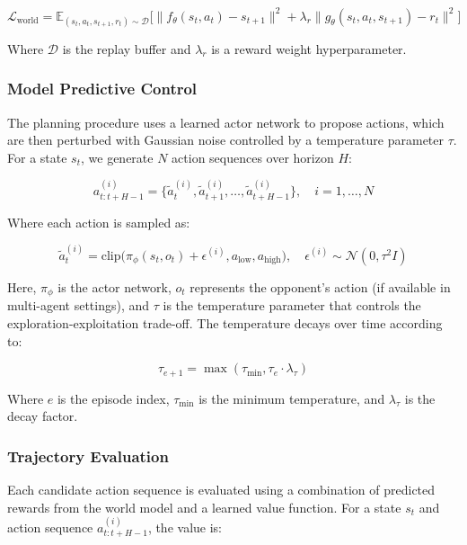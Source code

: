 \begin{equation}
\mathcal{L}_{\text{world}} = \mathbb{E}_{(s_t, a_t, s_{t+1}, r_t) \sim \mathcal{D}}\Big[\|f_\theta(s_t, a_t) - s_{t+1}\|^2 + \lambda_r\|g_\theta(s_t, a_t, s_{t+1}) - r_t\|^2\Big]
\end{equation}

Where $\mathcal{D}$ is the replay buffer and $\lambda_r$ is a reward weight hyperparameter.

\subsubsection{Model Predictive Control}

The planning procedure uses a learned actor network to propose actions, which are then perturbed with Gaussian noise controlled by a temperature parameter $\tau$. For a state $s_t$, we generate $N$ action sequences over horizon $H$:

\begin{equation}
a_{t:t+H-1}^{(i)} = \{\tilde{a}_t^{(i)}, \tilde{a}_{t+1}^{(i)}, \ldots, \tilde{a}_{t+H-1}^{(i)}\}, \quad i = 1, \ldots, N
\end{equation}

Where each action is sampled as:

\begin{equation}
\tilde{a}_t^{(i)} = \text{clip}\Big(\pi_\phi(s_t, o_t) + \epsilon^{(i)}, a_{\text{low}}, a_{\text{high}}\Big), \quad \epsilon^{(i)} \sim \mathcal{N}(0, \tau^2 I)
\end{equation}

Here, $\pi_\phi$ is the actor network, $o_t$ represents the opponent's action (if available in multi-agent settings), and $\tau$ is the temperature parameter that controls the exploration-exploitation trade-off. The temperature decays over time according to:

\begin{equation}
\tau_{e+1} = \max(\tau_{\min}, \tau_e \cdot \lambda_\tau)
\end{equation}

Where $e$ is the episode index, $\tau_{\min}$ is the minimum temperature, and $\lambda_\tau$ is the decay factor.

\subsubsection{Trajectory Evaluation}

Each candidate action sequence is evaluated using a combination of predicted rewards from the world model and a learned value function. For a state $s_t$ and action sequence $a_{t:t+H-1}^{(i)}$, the value is:

